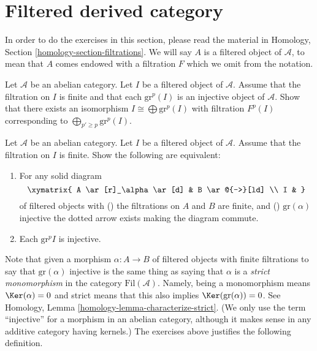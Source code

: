 \section{Filtered derived category}
\label{section-filtered-derived}

\noindent
In order to do the exercises in this section, please read the material
in Homology, Section \ref{homology-section-filtrations}. We will say
$A$ is a filtered object of $\mathcal{A}$, to mean that $A$ comes endowed
with a filtration $F$ which we omit from the notation.

\begin{exercise}
\label{exercise-split-injective}
Let $\mathcal{A}$ be an abelian category.
Let $I$ be a filtered object of $\mathcal{A}$.
Assume that the filtration on $I$ is finite
and that each $\text{gr}^p(I)$ is an injective object of $\mathcal{A}$.
Show that there exists an isomorphism
$I \cong \bigoplus \text{gr}^p(I)$ with filtration
$F^p(I)$ corresponding to $\bigoplus_{p' \geq p} \text{gr}^p(I)$.
\end{exercise}

\begin{exercise}
\label{exercise-filtered-injective}
Let $\mathcal{A}$ be an abelian category.
Let $I$ be a filtered object of $\mathcal{A}$.
Assume that the filtration on $I$ is finite.
Show the following are equivalent:
\begin{enumerate}
\item For any solid diagram
$$
\xymatrix{
A \ar[r]_\alpha \ar[d] & B \ar@{-->}[ld] \\
I &
}
$$
of filtered objects with
() the filtrations on $A$ and $B$ are finite,
and () $\text{gr}(\alpha)$ injective the
dotted arrow exists making the diagram commute.
\item Each $\text{gr}^p I$ is injective.
\end{enumerate}
\end{exercise}

\noindent
Note that given a morphism $\alpha : A \to B$ of filtered objects
with finite filtrations to say that $\text{gr}(\alpha)$ injective
is the same thing as saying that $\alpha$ is a {\it strict monomorphism}
in the category $\text{Fil}(\mathcal{A})$. Namely,
being a monomorphism means $\Ker(\alpha) = 0$ and strict means that
this also implies $\Ker(\text{gr}(\alpha)) = 0$.
See Homology, Lemma \ref{homology-lemma-characterize-strict}.
(We only use the term ``injective'' for a morphism in an abelian category,
although it makes sense in any additive category having kernels.)
The exercises above justifies the following definition.

